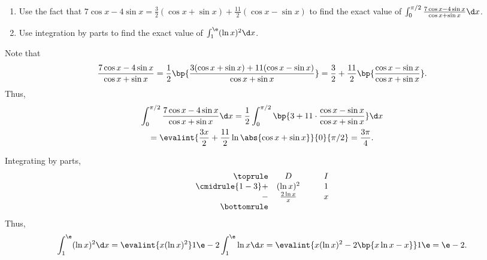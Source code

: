 \begin{problem}
    \begin{enumerate}
        \item Use the fact that $7\cos x - 4\sin x = \frac32 (\cos x + \sin x) + \frac{11}2 (\cos x - \sin x)$ to find the exact value of $\int_0^{\pi/2} \frac{7\cos x - 4\sin x}{\cos x + \sin x} \d x$.
        \item Use integration by parts to find the exact value of $\int_1^\e (\ln x)^2 \d x$.
    \end{enumerate}
\end{problem}
\begin{solution}
    \begin{ppart}
        Note that \[\frac{7\cos x - 4\sin x}{\cos x + \sin x} = \frac12 \bp{\frac{3(\cos x + \sin x) + 11(\cos x - \sin x)}{\cos x + \sin x}} = \frac32 + \frac{11}2 \bp{\frac{\cos x - \sin x}{\cos x + \sin x}}.\] Thus,
        \begin{gather*}
            \int_0^{\pi/2} \frac{7\cos x - 4\sin x}{\cos x + \sin x} \d x = \frac12 \int_0^{\pi/2} \bp{3 + 11 \cdot \frac{\cos x - \sin x}{\cos x + \sin x}} \d x\\
            = \evalint{\frac{3x}2 + \frac{11}{2}\ln\abs{\cos x + \sin x}}{0}{\pi/2} = \frac{3\pi}4.
        \end{gather*}
    \end{ppart}
    \begin{ppart}
        Integrating by parts,
        \[
            \begin{array}{r c @{\hspace*{1.0cm}} c}\toprule
                & D & I \\\cmidrule{1-3}
                + & (\ln x)^2 & 1 \\
                - & \frac{2\ln x}{x} & x \\\bottomrule
            \end{array}
        \]
        Thus,
        \begin{gather*}
            \int_1^\e (\ln x)^2 \d x = \evalint{x (\ln x)^2}1\e - 2\int_1^\e \ln x \d x = \evalint{x (\ln x)^2 - 2\bp{x \ln x - x}}1\e = \e - 2.
        \end{gather*}
    \end{ppart}
\end{solution}

